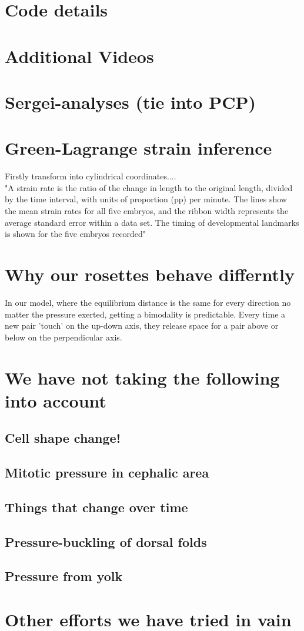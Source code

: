 \section{Code details}
\label{App:Code}
\section{Additional Videos}
\label{App:videos}
\section{Sergei-analyses (tie into PCP)}
\label{App:Sergei}
\section{Green-Lagrange strain inference}
\label{App:Strain-Calculation}
Firstly transform into cylindrical coordinates.... \\
"A strain rate is the ratio of the change in length to the original length, divided by the time interval, with units of proportion (pp) per minute. The lines show the mean strain rates for all five embryos, and the ribbon width represents the average standard error within a data set. The timing of developmental landmarks is shown for the five embryos recorded"\cite{butler2009cell}
\section{Why our rosettes behave differntly }
\label{App:why-rosettes}
In our model, where the equilibrium distance is the same for every direction no matter the pressure exerted, getting a bimodality is predictable.
Every time a new pair 'touch' on the up-down axis, they release space for a pair above or below on the perpendicular axis. 


\section{We have not taking the following into account}
\subsection*{Cell shape change!}
\subsection*{Mitotic pressure in cephalic area}
\subsection*{Things that change over time}
\subsection*{Pressure-buckling of dorsal folds}
\subsection*{Pressure from yolk}
\section*{Other efforts we have tried in vain}

